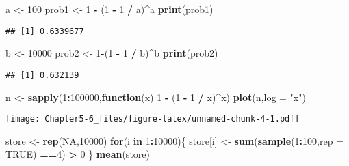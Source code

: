 \documentclass[
]{article}
\newenvironment{Shaded}{\begin{snugshade}}{\end{snugshade}}
\newcommand{\AttributeTok}[1]{\textcolor[rgb]{0.13,0.29,0.53}{#1}}
\newcommand{\ConstantTok}[1]{\textcolor[rgb]{0.56,0.35,0.01}{#1}}
\newcommand{\ControlFlowTok}[1]{\textcolor[rgb]{0.13,0.29,0.53}{\textbf{#1}}}
\newcommand{\DecValTok}[1]{\textcolor[rgb]{0.00,0.00,0.81}{#1}}
\newcommand{\FunctionTok}[1]{\textcolor[rgb]{0.13,0.29,0.53}{\textbf{#1}}}
\newcommand{\NormalTok}[1]{#1}
\newcommand{\OtherTok}[1]{\textcolor[rgb]{0.56,0.35,0.01}{#1}}
\newcommand{\SpecialCharTok}[1]{\textcolor[rgb]{0.81,0.36,0.00}{\textbf{#1}}}
\newcommand{\StringTok}[1]{\textcolor[rgb]{0.31,0.60,0.02}{#1}}
\begin{document}
\begin{Shaded}
\begin{Highlighting}[]
\NormalTok{a }\OtherTok{\textless{}{-}} \DecValTok{100}
\NormalTok{prob1 }\OtherTok{\textless{}{-}} \DecValTok{1} \SpecialCharTok{{-}}\NormalTok{ (}\DecValTok{1} \SpecialCharTok{{-}} \DecValTok{1} \SpecialCharTok{/}\NormalTok{ a)}\SpecialCharTok{\^{}}\NormalTok{a}
\FunctionTok{print}\NormalTok{(prob1)}
\end{Highlighting}
\end{Shaded}

\begin{verbatim}
## [1] 0.6339677
\end{verbatim}

\begin{Shaded}
\begin{Highlighting}[]
\NormalTok{b }\OtherTok{\textless{}{-}} \DecValTok{10000}
\NormalTok{prob2 }\OtherTok{\textless{}{-}} \DecValTok{1}\SpecialCharTok{{-}}\NormalTok{(}\DecValTok{1} \SpecialCharTok{{-}} \DecValTok{1} \SpecialCharTok{/}\NormalTok{ b)}\SpecialCharTok{\^{}}\NormalTok{b}
\FunctionTok{print}\NormalTok{(prob2)}
\end{Highlighting}
\end{Shaded}

\begin{verbatim}
## [1] 0.632139
\end{verbatim}

\begin{Shaded}
\begin{Highlighting}[]
\NormalTok{n }\OtherTok{\textless{}{-}} \FunctionTok{sapply}\NormalTok{(}\DecValTok{1}\SpecialCharTok{:}\DecValTok{100000}\NormalTok{,}\ControlFlowTok{function}\NormalTok{(x) }\DecValTok{1} \SpecialCharTok{{-}}\NormalTok{ (}\DecValTok{1} \SpecialCharTok{{-}} \DecValTok{1} \SpecialCharTok{/}\NormalTok{ x)}\SpecialCharTok{\^{}}\NormalTok{x)}
\FunctionTok{plot}\NormalTok{(n,}\AttributeTok{log =} \StringTok{"x"}\NormalTok{)}
\end{Highlighting}
\end{Shaded}

\texttt{[image: Chapter5-6\_files/figure-latex/unnamed-chunk-4-1.pdf]}

\begin{Shaded}
\begin{Highlighting}[]
\NormalTok{store }\OtherTok{\textless{}{-}} \FunctionTok{rep}\NormalTok{(}\ConstantTok{NA}\NormalTok{,}\DecValTok{10000}\NormalTok{)}
\ControlFlowTok{for}\NormalTok{(i }\ControlFlowTok{in} \DecValTok{1}\SpecialCharTok{:}\DecValTok{10000}\NormalTok{)\{}
\NormalTok{  store[i] }\OtherTok{\textless{}{-}} \FunctionTok{sum}\NormalTok{(}\FunctionTok{sample}\NormalTok{(}\DecValTok{1}\SpecialCharTok{:}\DecValTok{100}\NormalTok{,}\AttributeTok{rep =} \ConstantTok{TRUE}\NormalTok{) }\SpecialCharTok{==}\DecValTok{4}\NormalTok{) }\SpecialCharTok{\textgreater{}} \DecValTok{0}
\NormalTok{\}}
\FunctionTok{mean}\NormalTok{(store)}
\end{Highlighting}
\end{Shaded}
\end{document}

